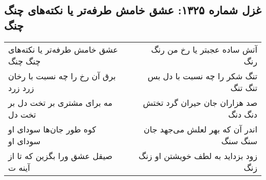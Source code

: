 \begin{center}
\section*{غزل شماره ۱۳۲۵: عشق خامش طرفه‌تر یا نکته‌های چنگ چنگ}
\label{sec:1325}
\begin{longtable}{l p{0.5cm} r}
عشق خامش طرفه‌تر یا نکته‌های چنگ چنگ
&&
آتش ساده عجبتر یا رخ من رنگ رنگ
\\
برق آن رخ را چه نسبت با رخان زرد زرد
&&
تنگ شکر را چه نسبت با دل بس تنگ تنگ
\\
مه برای مشتری بر تخت دل بر تخت دل
&&
صد هزاران جان حیران گرد تختش دنگ دنگ
\\
کوه طور جان‌ها سودای او سودای او
&&
اندر آن که بهر لعلش می‌جهد جان سنگ سنگ
\\
صیقل عشق ورا بگزین که تا از آینه ت
&&
زود بزداید به لطف خویشتن او زنگ زنگ
\\
\end{longtable}
\end{center}
